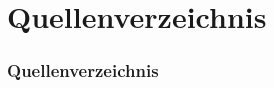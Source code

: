 \documentclass[11pt]{beamer}
\begin{document}
	\begin{frame}
		\maketitle
	\end{frame}
	
	
	
	
	
	

	\section{Quellenverzeichnis}
	\begin{frame}[allowframebreaks]
		\frametitle{Quellenverzeichnis}
		
		
	\end{frame}
	
\end{document}
